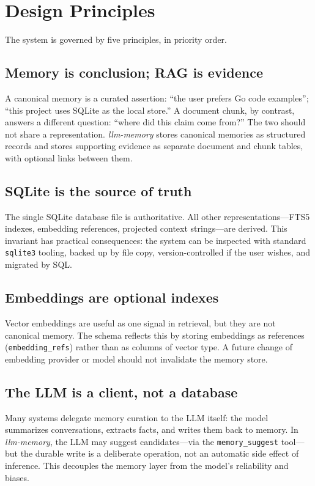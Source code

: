 \documentclass[11pt,a4paper]{article}
\begin{document}
\section{Design Principles}

The system is governed by five principles, in priority order.

\subsection{Memory is conclusion; RAG is evidence}

A canonical memory is a curated assertion: ``the user prefers Go code examples''; ``this project uses SQLite as the local store.'' A document chunk, by contrast, answers a different question: ``where did this claim come from?'' The two should not share a representation. \textit{llm-memory} stores canonical memories as structured records and stores supporting evidence as separate document and chunk tables, with optional links between them.

\subsection{SQLite is the source of truth}

The single SQLite database file is authoritative. All other representations---FTS5 indexes, embedding references, projected context strings---are derived. This invariant has practical consequences: the system can be inspected with standard \texttt{sqlite3} tooling, backed up by file copy, version-controlled if the user wishes, and migrated by SQL.

\subsection{Embeddings are optional indexes}

Vector embeddings are useful as one signal in retrieval, but they are not canonical memory. The schema reflects this by storing embeddings as references (\texttt{embedding\_refs}) rather than as columns of vector type. A future change of embedding provider or model should not invalidate the memory store.

\subsection{The LLM is a client, not a database}

Many systems delegate memory curation to the LLM itself: the model summarizes conversations, extracts facts, and writes them back to memory. In \textit{llm-memory}, the LLM may suggest candidates---via the \texttt{memory\_suggest} tool---but the durable write is a deliberate operation, not an automatic side effect of inference. This decouples the memory layer from the model's reliability and biases.
\end{document}

